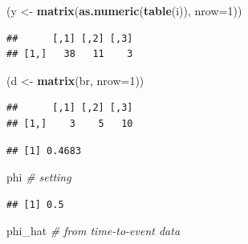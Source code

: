 \documentclass[12pt,]{book}
\newenvironment{Shaded}{\begin{snugshade}}{\end{snugshade}}
\newcommand{\CommentTok}[1]{\textcolor[rgb]{0.56,0.35,0.01}{\textit{#1}}}
\newcommand{\DataTypeTok}[1]{\textcolor[rgb]{0.13,0.29,0.53}{#1}}
\newcommand{\DecValTok}[1]{\textcolor[rgb]{0.00,0.00,0.81}{#1}}
\newcommand{\KeywordTok}[1]{\textcolor[rgb]{0.13,0.29,0.53}{\textbf{#1}}}
\newcommand{\NormalTok}[1]{#1}
\newcommand{\OperatorTok}[1]{\textcolor[rgb]{0.81,0.36,0.00}{\textbf{#1}}}
\newcommand{\StringTok}[1]{\textcolor[rgb]{0.31,0.60,0.02}{#1}}
\begin{document}
\begin{Shaded}
\begin{Highlighting}[]
\NormalTok{(y <-}\StringTok{ }\KeywordTok{matrix}\NormalTok{(}\KeywordTok{as.numeric}\NormalTok{(}\KeywordTok{table}\NormalTok{(i)), }\DataTypeTok{nrow=}\DecValTok{1}\NormalTok{))}
\end{Highlighting}
\end{Shaded}

\begin{verbatim}
##      [,1] [,2] [,3]
## [1,]   38   11    3
\end{verbatim}

\begin{Shaded}
\begin{Highlighting}[]
\NormalTok{(d <-}\StringTok{ }\KeywordTok{matrix}\NormalTok{(br, }\DataTypeTok{nrow=}\DecValTok{1}\NormalTok{))}
\end{Highlighting}
\end{Shaded}

\begin{verbatim}
##      [,1] [,2] [,3]
## [1,]    3    5   10
\end{verbatim}

\begin{Shaded}
\end{Shaded}

\begin{verbatim}
## [1] 0.4683
\end{verbatim}

\begin{Shaded}
\begin{Highlighting}[]
\NormalTok{phi }\CommentTok{# setting}
\end{Highlighting}
\end{Shaded}

\begin{verbatim}
## [1] 0.5
\end{verbatim}

\begin{Shaded}
\begin{Highlighting}[]
\NormalTok{phi_hat }\CommentTok{# from time-to-event data}
\end{Highlighting}
\end{Shaded}
\end{document}

